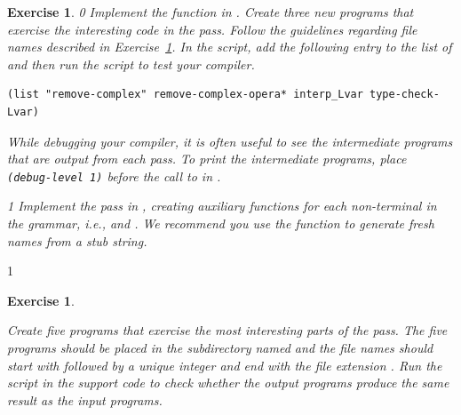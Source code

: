 \documentclass[7x10,nocrop]{TimesAPriori_MIT}%
\def\racketEd{0}
\def\pythonEd{1}
\def\edition{1}
\newtheorem{exercise}[theorem]{Exercise}
\begin{document}
\begin{exercise}
  \normalfont
{\if\edition\racketEd  
Implement the  function in
.
%
Create three new \LangVar{} programs that exercise the interesting
code in the  pass.  Follow the guidelines
regarding file names described in Exercise~\ref{ex:Lvar}.
%
In the  script, add the following entry to the
list of  and then run the script to test your compiler.
\begin{lstlisting}
(list "remove-complex" remove-complex-opera* interp_Lvar type-check-Lvar)
\end{lstlisting}
While debugging your compiler, it is often useful to see the
intermediate programs that are output from each pass. To print the
intermediate programs, place \lstinline{(debug-level 1)} before the call to
 in .
\fi}
%
{\if\edition\pythonEd
  Implement the  pass in
  , creating auxiliary functions for each
  non-terminal in the grammar, i.e., 
  and . We recommend you use the function
   to generate fresh names from a stub string.
\fi}  
\end{exercise}

{\if\edition\pythonEd
\begin{exercise}
\normalfont %
\label{ex:Lvar}

Create five \LangVar{} programs that exercise the most interesting
parts of the  pass.  The five programs
should be placed in the subdirectory named  and the file
names should start with  followed by a unique
integer and end with the file extension .
Run the  script in the support code to check
whether the output programs produce the same result as the input
programs.
\end{exercise}

\fi}
\end{document}

